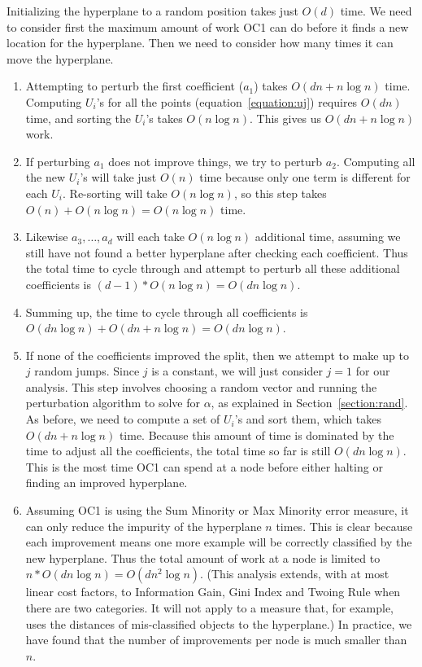 Initializing the hyperplane to a random position takes just $O(d)$
time.  We need to consider first the maximum amount of work OC1 can do
before it finds a new location for the hyperplane.  Then we need to
consider how many times it can move the hyperplane.
\begin{enumerate}
\item Attempting to perturb the first coefficient ($a_1$) takes 
$O(dn + n \log n)$ time.  Computing $U_i$'s for all the points
(equation~\ref{equation:uj}) requires $O(dn)$ time, and sorting the
$U_i$'s takes $O(n \log n)$.  This gives us $O(dn + n \log n)$ work.

\item If perturbing $a_1$ does not improve things, we try to perturb $a_2$.
Computing all the new $U_i$'s will take just $O(n)$ time because only
one term is different for each $U_i$.  Re-sorting will take $O(n \log n)$,
so this step takes $O(n) + O(n \log n) = O(n \log n)$ time.  

\item Likewise $a_3, \ldots, a_d$ will each take $O(n \log n)$
additional time, assuming we still have not found a better hyperplane
after checking each coefficient.  Thus the total time to cycle through
and attempt to perturb all these additional coefficients is 
$(d-1) * O(n \log n) = O(dn \log n)$.

\item Summing up, the time to cycle through all coefficients is
$O(dn \log n) + O(dn + n \log n) = O(dn \log n)$.

\item If none of the coefficients improved the split, then we attempt to
make up to $j$ random jumps.  Since $j$ is a constant, we will just
consider $j=1$ for our analysis.  This step involves choosing a
random vector and running the perturbation algorithm to solve
for $\alpha$, as explained in Section~\ref{section:rand}.
As before, we need to compute a set of $U_i$'s and sort them,
which takes $O(dn + n \log n)$ time.  Because this amount of time
is dominated by the time to adjust all the coefficients, 
the total time so far is still $O(dn \log n)$.  This is the most
time OC1 can spend at a node before either halting or finding
an improved hyperplane.

\item Assuming OC1 is using the Sum Minority or Max Minority error 
measure, it can only reduce the impurity of the hyperplane $n$ times.
This is clear because each improvement means one more example will be
correctly classified by the new hyperplane.  Thus the total amount of
work at a node is limited to $n * O(dn \log n) = O(dn^2 \log n)$.
(This analysis extends, with at most linear cost factors, to
Information Gain, Gini Index and Twoing Rule when there are two
categories.  It will not apply to a measure that, for example, uses
the distances of mis-classified objects to the hyperplane.)  In
practice, we have found that the number of improvements per node is
much smaller than $n$.
\end{enumerate}

